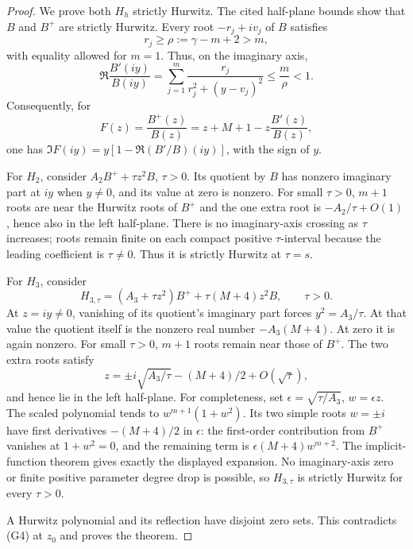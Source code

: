 \documentclass[11pt]{article}
\begin{document}
\begin{proof}
We prove both $H_h$ strictly Hurwitz. The cited half-plane bounds
show that $B$ and $B^+$ are strictly Hurwitz. Every root
$-r_j+iv_j$ of $B$ satisfies
\[
 r_j\ge\rho:=\gamma-m+2>m,
\]
with equality allowed for $m=1$. Thus, on the imaginary axis,
\[
 \Re\frac{B'(iy)}{B(iy)}
   =\sum_{j=1}^m\frac{r_j}{r_j^2+(y-v_j)^2}
   \le\frac m\rho<1.
\]
Consequently, for
\[
 F(z)=\frac{B^+(z)}{B(z)}
     =z+M+1-z\frac{B'(z)}{B(z)},
\]
one has $\Im F(iy)=y[1-\Re(B'/B)(iy)]$, with the sign of $y$.

For $H_2$, consider $A_2B^++\tau z^2B$, $\tau>0$.
Its quotient by $B$ has nonzero imaginary part at $iy$ when $y\ne0$,
and its value at zero is nonzero. For small $\tau>0$, $m+1$ roots
are near the Hurwitz roots of $B^+$ and the one extra root is
$-A_2/\tau+O(1)$, hence also in the left half-plane.
There is no imaginary-axis crossing as $\tau$ increases; roots
remain finite on each compact positive $\tau$-interval because
the leading coefficient is $\tau\ne0$. Thus it is strictly Hurwitz
at $\tau=s$.

For $H_3$, consider
\[
 H_{3,\tau}=(A_3+\tau z^2)B^++\tau(M+4)z^2B,\qquad\tau>0.
\]
At $z=iy\ne0$, vanishing of its quotient's imaginary part forces
$y^2=A_3/\tau$. At that value the quotient itself is the nonzero
real number $-A_3(M+4)$. At zero it is again nonzero.
For small $\tau>0$, $m+1$ roots remain near those of $B^+$.
The two extra roots satisfy
\[
 z=\pm i\sqrt{A_3/\tau}-(M+4)/2+O(\sqrt\tau),
\]
and hence lie in the left half-plane.
For completeness, set $\epsilon=\sqrt{\tau/A_3}$, $w=\epsilon z$.
The scaled polynomial tends to $w^{m+1}(1+w^2)$.
Its two simple roots $w=\pm i$ have first derivatives
$-(M+4)/2$ in $\epsilon$: the first-order contribution from $B^+$
vanishes at $1+w^2=0$, and the remaining term is
$\epsilon(M+4)w^{m+2}$. The implicit-function theorem gives exactly
the displayed expansion. No imaginary-axis zero or finite positive
parameter degree drop is possible, so $H_{3,\tau}$ is strictly
Hurwitz for every $\tau>0$.

A Hurwitz polynomial and its reflection have disjoint zero sets.
This contradicts (G4) at $z_0$ and proves the theorem.
\end{proof}
\end{document}
